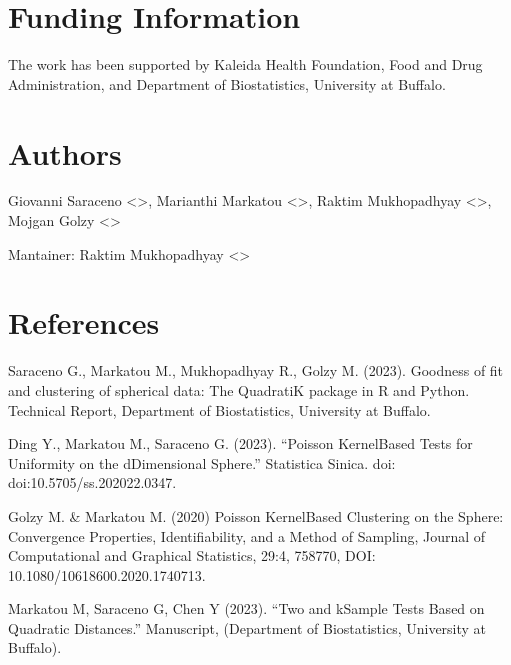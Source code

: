 \documentclass[letterpaper,10pt,english,openany,oneside]{sphinxmanual}
\begin{document}
\section{Funding Information}
\label{\detokenize{index:funding-information}}
\sphinxAtStartPar
The work has been supported by Kaleida Health Foundation, Food and Drug Administration, and Department of Biostatistics, University at Buffalo.


\section{Authors}
\label{\detokenize{index:authors}}
\sphinxAtStartPar
Giovanni Saraceno \textless{}\textgreater{}, Marianthi Markatou \textless{}\textgreater{}, Raktim Mukhopadhyay \textless{}\textgreater{}, Mojgan Golzy \textless{}\textgreater{}

\sphinxAtStartPar
Mantainer: Raktim Mukhopadhyay \textless{}\textgreater{}


\section{References}
\label{\detokenize{index:references}}
\sphinxAtStartPar
Saraceno G., Markatou M., Mukhopadhyay R., Golzy M. (2023). Goodness of\sphinxhyphen{}
fit and clustering of spherical data: The QuadratiK package in R and Python. Technical Report,
Department of Biostatistics, University at Buffalo.

\sphinxAtStartPar
Ding Y., Markatou M., Saraceno G. (2023). “Poisson Kernel\sphinxhyphen{}Based Tests for
Uniformity on the d\sphinxhyphen{}Dimensional Sphere.” Statistica Sinica. doi: doi:10.5705/ss.202022.0347.

\sphinxAtStartPar
Golzy M. \& Markatou M. (2020) Poisson Kernel\sphinxhyphen{}Based Clustering on the Sphere:
Convergence Properties, Identifiability, and a Method of Sampling, Journal of Computational and
Graphical Statistics, 29:4, 758\sphinxhyphen{}770, DOI: 10.1080/10618600.2020.1740713.

\sphinxAtStartPar
Markatou M, Saraceno G, Chen Y (2023). “Two\sphinxhyphen{} and k\sphinxhyphen{}Sample Tests Based on Quadratic Distances.”
Manuscript, (Department of Biostatistics, University at Buffalo).
\end{document}
